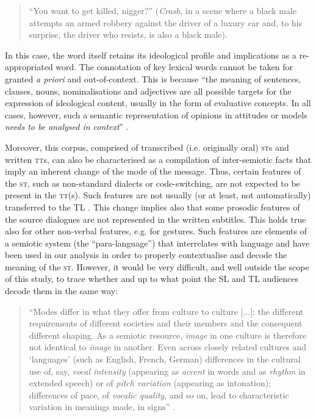 \documentclass[output=paper]{LSP/langsci}
\begin{document}
\begin{quote}
 “You want to get killed, nigger?”\newline
\noindent (\textit{Crash}, in a scene where a black male attempts an armed robbery against the driver of a luxury car and, to his surprise, the driver who resists, is also a black male).
\end{quote}

In this case, the word itself retains its ideological profile and implications as a re-appropriated word. The connotation of key lexical words cannot be taken for granted \textit{a priori} and out-of-context. This is because “the meaning of sentences, clauses, nouns, nominalisations and adjectives are all possible targets for the expression of ideological content, usually in the form of evaluative concepts. In all cases, however, such a semantic representation of opinions in attitudes or models \textit{needs to be analysed in context}” \citep[260; our emphasis]{Dijk1995}.

Moreover, this corpus, comprised of transcribed (i.e. originally oral) \textsc{st}s and written \textsc{tt}s, can also be characterised as a compilation of inter-semiotic facts \citep{Jakobson2012} that imply an inherent change of the mode of the message. Thus, certain features of the \textsc{st}, such as non-standard dialects or code-switching, are not expected to be present in the \textsc{tt}(s). Such features are not usually (or at least, not automatically) transferred to the TL \citep[78]{Hatim1997}. This change implies also that some prosodic features of the source dialogues are not represented in the written subtitles. This holds true also for other non-verbal features, e.g. for gestures. Such features are elements of a semiotic system (the “para-language”) that interrelates with language \citep[32--42]{Halliday2014} and have been used in our analysis in order to properly contextualise and decode the meaning of the \textsc{st}. However, it would be very difficult, and well outside the scope of this study, to trace whether and up to what point the SL and TL audiences decode them in the same way:

\begin{quote}
“Modes differ in what they offer from culture to culture [...]: the different requirements of different societies and their members and the consequent different shaping. As a semiotic resource, \textit{image} in one culture is therefore not identical to \textit{image} in another. Even across closely related cultures and `languages' (such as English, French, German) differences in the cultural use of, say, \textit{vocal intensity} (appearing as \textit{accent} in words and as \textit{rhythm} in extended speech) or of \textit{pitch variation} (appearing as intonation); differences of pace, of \textit{vocalic quality}, and so on, lead to characteristic variation in meanings made, in signs” \citep[81; emphasis in the original]{Kress2010}.
\end{quote}
\end{document}
